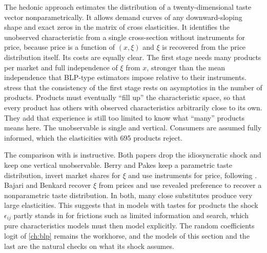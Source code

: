 The hedonic approach estimates the distribution of a twenty-dimensional taste vector nonparametrically. It allows demand
curves of any downward-sloping shape and exact zeros in the matrix of cross elasticities. It identifies the unobserved
characteristic from a single cross-section without instruments for price, because price is a function of $(x, \xi)$ and $\xi$
is recovered from the price distribution itself. Its costs are equally clear. The first stage needs many products per market
and full independence of $\xi$ from $x$, stronger than the mean independence that BLP-type estimators impose relative to
their instruments. \citet[p.~35]{AckerbergEtAl2007} stress that the consistency of the first stage rests on asymptotics in
the number of products. Products must eventually ``fill up'' the characteristic space, so that every product has others
with observed characteristics arbitrarily close to its own. They add that experience is still too limited to know what
``many'' products means here. The unobservable is single and vertical. Consumers are assumed fully informed, which the elasticities with
695 products reject.

The comparison with \citet{BerryPakes2007} is instructive. Both papers drop the idiosyncratic shock and keep one vertical
unobservable. Berry and Pakes keep a parametric taste distribution, invert market shares for $\xi$ and use instruments for price,
following \citet{BerryLevinsohnPakes1995}. Bajari and Benkard recover $\xi$ from prices and use revealed preference to recover a
nonparametric taste distribution. In both, many close substitutes produce very large elasticities. This suggests that in models
with tastes for products the shock $\epsilon_{ij}$ partly stands in for frictions such as limited information and search, which
pure characteristics models must then model explicitly. The random coefficients logit of \cref{ch:blp} remains the workhorse,
and the models of this section and the last are the natural checks on what its shock assumes.
